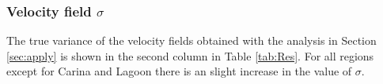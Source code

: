 \documentclass[fleqn,usenatbib, useAMS, a4paper]{mnras}
\begin{document}


\subsubsection{Velocity field \(\sigma\)}

The true variance of the velocity fields obtained with the analysis in Section \ref{sec:apply} is shown in the second column in Table \ref{tab:Res}. 
For all regions except for Carina and Lagoon there is an slight increase in the value of $\sigma$.
\end{document}
